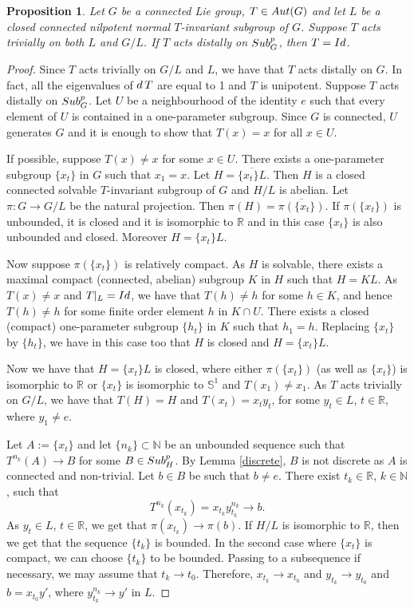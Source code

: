 \documentclass{amsart}
\numberwithin{equation}{section}
\newcommand{\Aut}{{\rm Aut}}
\newcommand{\N}{{\mathbb N}}
\newcommand{\R}{{\mathbb R}}
\newcommand{\Sc}{{\mathbb S}}
\newcommand{\spg}{{\rm Sub}^p_G}
\newcommand{\spp}{{\rm Sub}^{p}}
\newcommand{\du}{{\rm d\,}}
\newcommand{\Id}{{\rm Id}}
\let\ol=\overline
\newtheorem{prop}[thm]{Proposition}
\theoremstyle{remark}
\begin{document}
\begin{prop} \label {crux}
Let $G$ be a connected Lie group, $T\in\Aut(G)$ and let $L$ be a closed connected nilpotent normal $T$-invariant 
subgroup of $G$. Suppose $T$ acts trivially on both $L$ and $G/L$. If $T$ acts distally on $\spg$, then $T=\Id$. 
\end{prop}

\begin{proof} Since $T$ acts trivially on $G/L$ and $L$, we have that $T$ acts distally on $G$. In fact, all the eigenvalues 
of $\du T$ are equal to 1 and $T$ is unipotent. Suppose $T$ acts distally on $\spg$. Let $U$ be a neighbourhood 
of the identity $e$ such that every element of $U$ is contained in a one-parameter subgroup. Since $G$ is 
connected, $U$ generates $G$ and it is enough to show that $T(x)=x$ for all $x\in U$. 
 
\smallskip
  If possible, suppose $T(x)\ne x$ for some $x\in U$. There exists a one-parameter 
 subgroup $\{x_t\}$ in $G$ such that $x_1=x$. Let $H=\ol{\{x_t\}L}$. Then $H$ is a closed connected solvable $T$-invariant 
 subgroup of $G$ and $H/L$ is abelian. Let $\pi:G\to G/L$ be the natural projection.  
 Then $\pi(H)=\ol{\pi(\{x_t\})}$. If $\pi(\{x_t\})$ is unbounded, it is closed and it is isomorphic to $\R$ and in this case 
 $\{x_t\}$ is also unbounded and closed. Moreover $H=\{x_t\}L$.
 
Now suppose $\pi(\{x_t\})$ is relatively compact. As $H$ is solvable, there exists a maximal compact 
(connected, abelian) subgroup $K$ in $H$ such that $H=KL$. As $T(x)\ne x$ and $T|_L=\Id$, 
we have that $T(h)\ne h$ for some $h\in K$, and hence $T(h)\ne h$ for some finite order element $h$ in $K\cap U$.
There exists a closed (compact) one-parameter subgroup $\{h_t\}$ in $K$ such that $h_1=h$. Replacing 
$\{x_t\}$ by $\{h_t\}$, we have in this case too that $H$ is closed and $H=\{x_t\}L$.

Now we have that $H=\{x_t\}L$ is closed, where either $\pi(\{x_t\})$ (as well as $\{x_t\}$) is isomorphic to $\R$ 
or $\{x_t\}$ is isomorphic to $\Sc^1$ and $T(x_1)\ne x_1$. As $T$ acts trivially on $G/L$, we have that $T(H)=H$ 
and $T(x_t)=x_ty_t$, for some $y_t\in L$, $t\in\R$, where $y_1\ne e$. 

 \smallskip
  Let $A:=\{x_t\}$ and let $\{n_k\}\subset\N$ be an unbounded sequence 
such that $T^{n_k}(A)\to B$ for some $B\in\spp_H$. By Lemma \ref{discrete}, $B$ is not discrete as $A$ 
is connected and non-trivial. Let $b\in B$ be such that $b\ne e$. There exist $t_k\in\R$, $k\in\N$, 
such that 
$$
T^{n_k}(x_{t_k})=x_{t_k}y_{t_k}^{n_k}\to b.$$ 
 As $y_t\in L$, $t\in\R$, we get that $\pi(x_{t_k})\to\pi(b)$. If $H/L$ is isomorphic to $\R$, 
then we get that the sequence $\{t_k\}$ is bounded. In the second case where $\{x_t\}$ is compact, we 
can choose $\{t_k\}$ to be bounded. Passing to a subsequence if necessary, we may assume that 
$t_k\to t_0$. Therefore, $x_{t_k}\to x_{t_0}$ and $y_{t_k}\to y_{t_0}$ and 
$b=x_{t_0}y'$, where $y_{t_k}^{n_k}\to y'$ in $L$. 


\end{proof}
\end{document}
